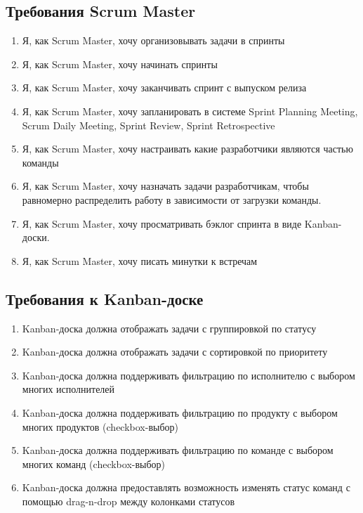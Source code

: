 \documentclass{article}
\begin{document}
\subsection{Требования Scrum Master}
\begin{enumerate}[label=\textbf{SMR\arabic*}.]
	\item Я, как Scrum Master, хочу организовывать задачи в спринты
	\item Я, как Scrum Master, хочу начинать спринты
	\item Я, как Scrum Master, хочу заканчивать спринт с выпуском релиза
	\item Я, как Scrum Master, хочу запланировать в системе
	      Sprint Planning Meeting, Scrum Daily Meeting, Sprint Review, Sprint Retrospective
	\item Я, как Scrum Master, хочу настраивать какие разработчики являются частью команды
	\item Я, как Scrum Master, хочу назначать задачи разработчикам, чтобы равномерно распределить работу в зависимости от загрузки команды.
	\item Я, как Scrum Master, хочу просматривать бэклог спринта в виде Kanban-доски.
	\item Я, как Scrum Master, хочу писать минутки к встречам
\end{enumerate}

\subsection{Требования к Kanban-доске}
\begin{enumerate}[label=\textbf{KBR\arabic*}.]
	\item Kanban-доска должна отображать задачи с группировкой по статусу
	\item Kanban-доска должна отображать задачи с сортировкой по приоритету
	\item Kanban-доска должна поддерживать фильтрацию по исполнителю с выбором
	      многих исполнителей
	\item Kanban-доска должна поддерживать фильтрацию по продукту с выбором
	      многих продуктов (checkbox-выбор)
	\item Kanban-доска должна поддерживать фильтрацию по команде с выбором
	      многих команд (checkbox-выбор)
	\item Kanban-доска должна предоставлять возможность изменять статус
	      команд с помощью drag-n-drop между колонками статусов
\end{enumerate}
\end{document}

